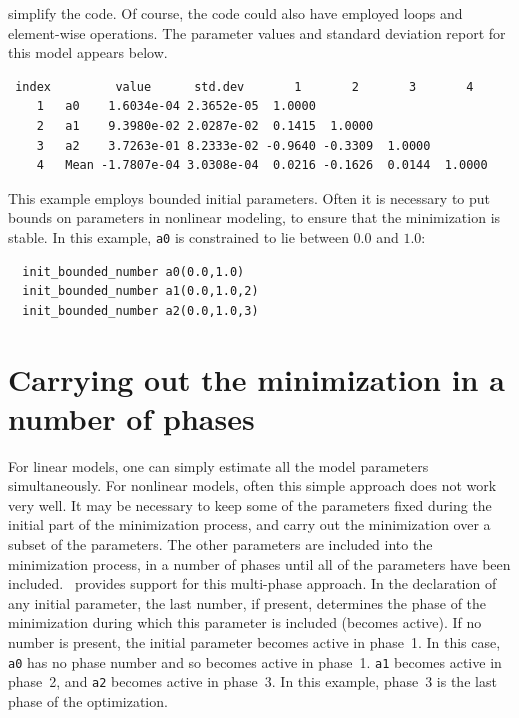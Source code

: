 \documentclass{admbmanual}
\begin{document}
simplify the code. Of course, the code could also have employed loops and
element-wise operations. The parameter values and standard deviation report for
this model appears below.
\begin{lstlisting}
 index         value      std.dev       1       2       3       4
    1   a0    1.6034e-04 2.3652e-05  1.0000
    2   a1    9.3980e-02 2.0287e-02  0.1415  1.0000
    3   a2    3.7263e-01 8.2333e-02 -0.9640 -0.3309  1.0000
    4   Mean -1.7807e-04 3.0308e-04  0.0216 -0.1626  0.0144  1.0000
\end{lstlisting}
This example employs bounded initial parameters. Often it is necessary to put
bounds on parameters in nonlinear modeling, to ensure that the minimization is
stable. In this example, \texttt{a0} is constrained to lie between $0.0$ and
$1.0$:
\begin{lstlisting}
  init_bounded_number a0(0.0,1.0)
  init_bounded_number a1(0.0,1.0,2)
  init_bounded_number a2(0.0,1.0,3)
\end{lstlisting}

\section{Carrying out the minimization in a number of phases}

For linear models, one can simply estimate all the model parameters
simultaneously. For nonlinear models, often this simple approach does not work
very well. It may be necessary to keep some of the parameters fixed during the
initial part of the minimization process, and carry out the minimization over a
subset of the parameters. The other parameters are included into the
minimization process, in a number of phases until all of the parameters have
been included. \ADM\ provides support for this multi-phase approach. In the
declaration of any initial parameter, the last number, if present, determines
the phase of the minimization during which this parameter is included (becomes
active). If no number is present, the initial parameter becomes active in
phase~1. In this case, \texttt{a0} has no phase number and so becomes active in
phase~1. \texttt{a1} becomes active in phase~2, and \texttt{a2} becomes active
in phase~3. In this example, phase~3 is the last phase of the optimization.
\end{document}
